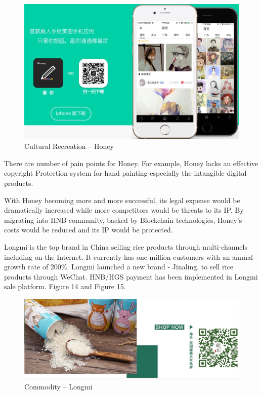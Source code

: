 \documentclass[fleqn,10pt]{SelfArx} %
\begin{document}
\begin{figure}[ht]\centering
\includegraphics[width=\linewidth]{13}
\caption{Cultural Recreation – Honey}
\label{fig:13}
\end{figure}

There are number of pain points for Honey. For example, Honey lacks an effective copyright Protection system for hand painting especially the intangible digital products. 

With Honey becoming more and more successful, its legal expense would be dramatically increased while more competitors would be threats to its IP. By migrating into HNB community, backed by Blockchain technologies, Honey’s costs would be reduced and its IP would be protected.\\



Longmi is the top brand in China selling rice products through multi-channels including on the Internet. It currently has one million customers with an annual growth rate of 200\%. Longmi launched a new brand - Jinaling, to sell rice products through WeChat.  HNB/HGS payment has been implemented in Longmi sale platform. Figure 14 and Figure 15.

\begin{figure}[ht]\centering
\includegraphics[width=\linewidth]{14}
\caption{Commodity – Longmi}
\label{fig:14}
\end{figure}
\end{document}
